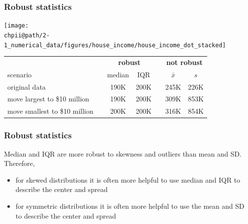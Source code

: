 \documentclass[slidestop,compress,mathserif]{beamer}
\makeatletter
\newcommand{\soln}[1]{\textit{#1}}
\def\chpii@path{../../Chp 2}
\makeatother
\begin{document}
\begin{frame}
\frametitle{Robust statistics}

\begin{center}
\texttt{[image: \\chpii@path/2-1\_numerical\_data/figures/house\_income/house\_income\_dot\_stacked]}
\end{center}

{\small
\begin{center}
\begin{tabular}{l c cc c cc}
  \hline
& \hspace{0mm} & \multicolumn{2}{c}{\bf robust} & \hspace{2mm} & \multicolumn{2}{c}{\bf not robust} \\
scenario && median & IQR && $\bar{x}$ & $s$ \\ 
  \hline
original data && 190K & 200K && 245K & 226K \\ 
move largest to \$10 million && 190K & 200K && 309K & 853K \\ 
move smallest to \$10 million && 200K & 200K && 316K & 854K \\ 
   \hline
\end{tabular}
\end{center}
}

\end{frame}


\begin{frame}
\frametitle{Robust statistics}

Median and IQR are more robust to skewness and outliers than mean and SD. Therefore,

\begin{itemize}
\item for skewed distributions it is often more helpful to use median and IQR to describe the center and spread
\item for symmetric distributions it is often more helpful to use the mean and SD to describe the center and spread
\end{itemize}

$\:$ \\

\pause


\soln{}

\end{frame}
\end{document}
